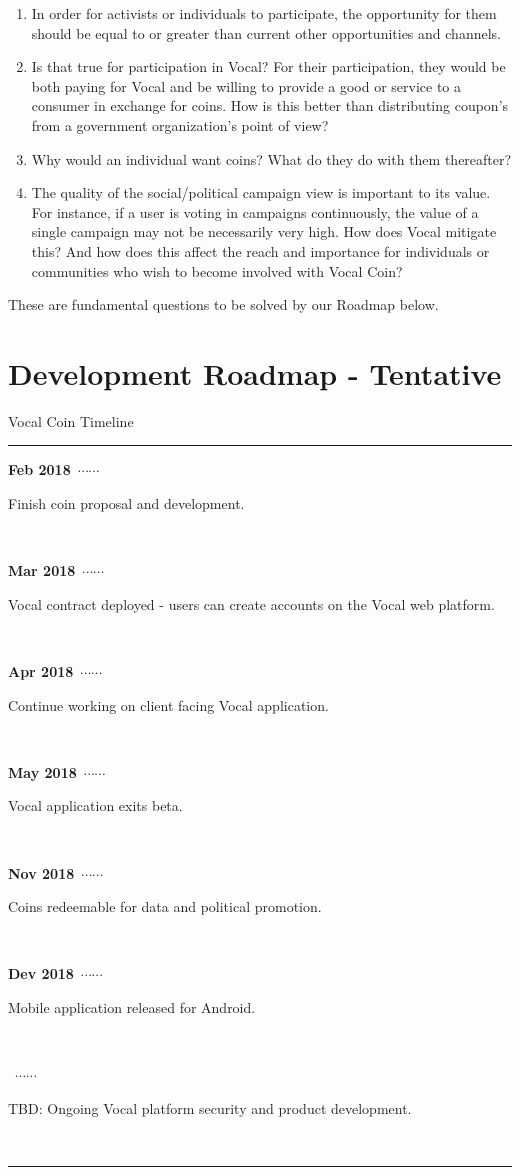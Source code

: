 \documentclass[conference]{IEEEtran}
\begin{document}
    \begin{enumerate}
      \item In order for activists or individuals to participate, the opportunity for them should be equal to or greater than current other opportunities and channels.
      \item Is that true for participation in Vocal? For their participation, they would be both paying for Vocal and be willing to provide a good or service to a consumer in exchange for coins. How is this better than distributing coupon’s from a government organization’s point of view?
      \item Why would an individual want coins? What do they do with them thereafter?
      \item The quality of the social/political campaign view is important to its value. For instance, if a user is voting in campaigns continuously, the value of a single campaign may not be necessarily very high. How does Vocal mitigate this? And how does this affect the reach and importance for individuals or communities who wish to become involved with Vocal Coin?
    \end{enumerate}

    These are fundamental questions to be solved by our Roadmap below.
    
    \section{Development Roadmap - Tentative}


    \newcommand\ytl[2]{
    \parbox[b]{8em}{\hfill{\color{cyan}\bfseries\sffamily #1}~$\cdots\cdots$~}\makebox[0pt][c]{$\bullet$}\vrule\quad \parbox[c]{3cm}{\vspace{7pt}\color{red!40!black!80}\raggedright\sffamily #2.\\[7pt]}\\[-3pt]}
    \begin{table}
    \caption{Vocal Coin Timeline}
    \centering
    \begin{minipage}[t]{\linewidth}
    \color{gray}
    \rule{\linewidth}{1pt}
    \ytl{Feb 2018}{Finish coin proposal and development}
    \ytl{Mar 2018}{Vocal contract deployed - users can create accounts on the Vocal web platform}
    \ytl{Apr 2018}{Continue working on client facing Vocal application}
    \ytl{May 2018}{Vocal application exits beta}
    \ytl{Nov 2018}{Coins redeemable for data and political promotion}
    \ytl{Dev 2018}{Mobile application released for Android}
    \ytl{2019}{TBD: Ongoing Vocal platform security and product development}
    \bigskip
    \rule{\linewidth}{1pt}%
    \end{minipage}%
    \end{table}
\end{document}
